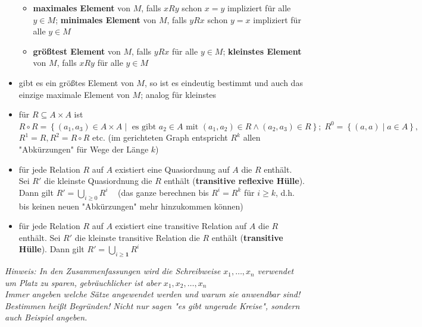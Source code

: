 \documentclass[10pt,a4paper]{article}
\begin{document}
\begin{itemize}
\begin{itemize}
\item \textbf{maximales Element} von $M$, falls $xRy$ schon $x=y$ impliziert für alle $y\in M$; \textbf{minimales Element} von $M$, falls $yRx$ schon $y=x$ impliziert für alle $y\in M$
\item \textbf{größtest Element} von $M$, falls $yRx$ für alle $y\in M$; \textbf{kleinstes Element} von $M$, falls $xRy$ für alle $y\in M$ 
\end{itemize}

\item gibt es ein größtes Element von $M$, so ist es eindeutig bestimmt und auch das einzige maximale Element von $M$; analog für kleinstes 
\item für $R\subseteq A\times A$ ist $R\circ R=\left\lbrace (a_{1},a_{3})\in A\times A\mid \text{ es gibt } a_{2} \in A \text{ mit } (a_{1},a_{2}) \in R\land (a_{2},a_{3})\in R\right\rbrace; \;R^{0}=\left\lbrace (a,a) \mid a\in A\right\rbrace,$\\ $R^{1}=R, R^{2}=R\circ R$ etc. (im gerichteten Graph entspricht $R^{k}$ allen "Abkürzungen" für Wege der Länge $k$)
\item für jede Relation $R$ auf $A$ existiert eine Quasiordnung auf $A$ die $R$ enthält. Sei $R'$ die kleinste Quasiordnung die $R$ enthält (\textbf{transitive reflexive Hülle}). Dann gilt $R'=\bigcup_{i\geq 0} R^{i}\;\;\;$  (das ganze berechnen bis $R^{i}=R^{k}$ für $i\geq k$, d.h. bis keinen neuen "Abkürzungen" mehr hinzukommen können)
\item für jede Relation $R$ auf $A$ existiert eine transitive Relation auf $A$ die $R$ enthält. Sei $R'$ die kleinste transitive Relation die $R$ enthält (\textbf{transitive Hülle}). Dann gilt $R'=\bigcup_{i\geq \boldsymbol{1}} R^{i}$
\end{itemize}
\textit{Hinweis: In den Zusammenfassungen wird die Schreibweise} $x_{1},\dotsc ,x_{n}$ \textit{verwendet um Platz zu sparen,} \textit{gebräuchlicher ist aber} $x_{1},x_{2},\dotsc ,x_{n}$\\
\textit{Immer angeben welche Sätze angewendet werden und warum sie anwendbar sind!}\\
\textit{Bestimmen heißt Begründen! Nicht nur sagen "es gibt ungerade Kreise", sondern auch Beispiel angeben.}
\end{document}
